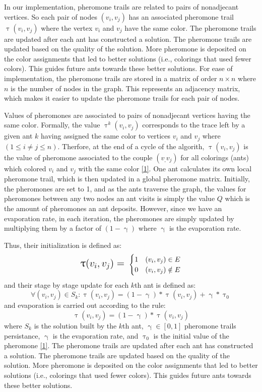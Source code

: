 \documentclass{article}
\theoremstyle{mytheoremstyle}
\theoremstyle{mytheoremstyle}
\theoremstyle{myproblemstyle}
\begin{document}
In our implementation, pheromone trails are related to pairs of nonadjecant vertices. So each pair of nodes $ (v_i, v_j) $ has an associated pheromone trail $ \uptau(v_i, v_j) $ where the vertex $ v_i $ and $ v_j $ have the same color. The pheromone trails are updated after each ant has constructed a solution. The pheromone trails are updated based on the quality of the solution. More pheromone is deposited on the color assignments that led to better solutions (i.e., colorings that used fewer colors). This guides future ants towards these better solutions. For ease of implementation, the pheromone trails are stored in a matrix of order $n \times n$ where $n$ is the number of nodes in the graph. This represents an adjacency matrix, which makes it easier to update the pheromone trails for each pair of nodes.

Values of pheromones are associated to pairs of nonadjecant vertices having the same color. Formally, the value $ \uptau^k(v_i, v_j) $ corresponds to the trace left by a given ant $k$ having assigned the same color to vertices $ v_i $ and $ v_j $ where $ (1 \leq i \neq j \leq n) $. Therfore, at the end of a cycle of the algorith, $ \uptau(v_i, v_j) $ is the value of pheromone associated to the couple $ (v_, v_j) $ for all colorings (ants) which colored $ v_i $ and $ v_j $ with the same color \hyperlink{refpaper}{[1]}. One ant calculates its own local pheromone trail, which is then updated in a global pheromone matrix. Initially, the pheromones are set to 1, and as the ants traverse the graph, the values for pheromones between any two nodes an ant visits is simply the value $Q$ which is the amount of pheromones an ant deposits. However, since we have an evaporation rate, in each iteration, the pheromones are simply updated by multiplying them by a factor of $ (1 - \upgamma) $ where $ \upgamma $ is the evaporation rate.

Thus, their initialization is defined as:
\[
    \text{\Large $\uptau(v_i, v_j) = $ }
    \begin{cases}
        1 & (v_i, v_j) \in E    \\
        0 & (v_i, v_j) \notin E
    \end{cases}
\]
and their stage by stage update for each $k$th ant is defined as:
\[ \forall(v_i, v_j) \in S_k: \uptau(v_i, v_j) = (1 - \upgamma) * \uptau(v_i, v_j) + \upgamma * \uptau_0 \]
and evaporation is carried out according to the rule:
\[ \uptau(v_i, v_j) = (1 - \upgamma) * \uptau(v_i, v_j) \]
where $ S_k $ is the solution built by the $k$th ant, $ \upgamma \in [0, 1] $ pheromone trails persistance, $ \upgamma $ is the evaporation rate, and $ \uptau_0 $ is the initial value of the pheromone \hyperlink{refpaper}{[1]}. The pheromone trails are updated after each ant has constructed a solution. The pheromone trails are updated based on the quality of the solution. More pheromone is deposited on the color assignments that led to better solutions (i.e., colorings that used fewer colors). This guides future ants towards these better solutions.
\end{document}
